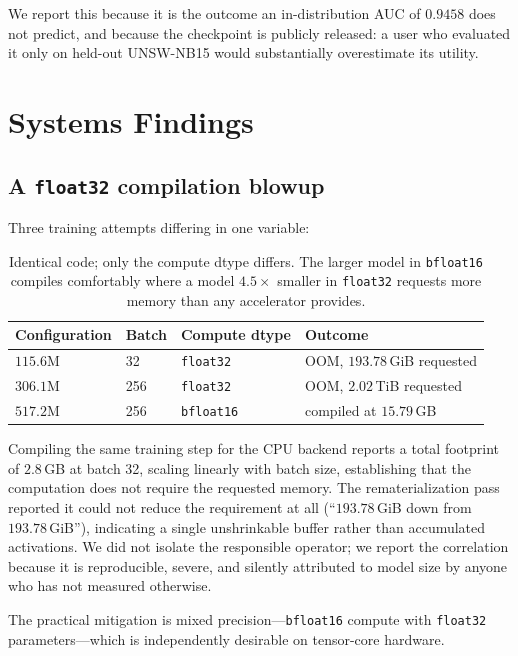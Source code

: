 \documentclass[11pt]{article}
\begin{document}
We report this because it is the outcome an in-distribution AUC of $0.9458$ does
not predict, and because the checkpoint is publicly released: a user who
evaluated it only on held-out UNSW-NB15 would substantially overestimate its
utility.

\section{Systems Findings}
\label{sec:systems}

\subsection{A \texttt{float32} compilation blowup}

Three training attempts differing in one variable:

\begin{table}[h]
\centering
\begin{tabular}{llll}
\toprule
Configuration & Batch & Compute dtype & Outcome \\
\midrule
$115.6$M & 32 & \texttt{float32} & OOM, $193.78$\,GiB requested \\
$306.1$M & 256 & \texttt{float32} & OOM, $2.02$\,TiB requested \\
$517.2$M & 256 & \texttt{bfloat16} & compiled at $15.79$\,GB \\
\bottomrule
\end{tabular}
\caption{Identical code; only the compute dtype differs. The larger model in
\texttt{bfloat16} compiles comfortably where a model $4.5\times$ smaller in
\texttt{float32} requests more memory than any accelerator provides.}
\label{tab:blowup}
\end{table}

Compiling the same training step for the CPU backend reports a total footprint
of $2.8$\,GB at batch 32, scaling linearly with batch size, establishing that the
computation does not require the requested memory. The rematerialization pass
reported it could not reduce the requirement at all
(``$193.78$\,GiB down from $193.78$\,GiB''), indicating a single unshrinkable
buffer rather than accumulated activations. We did not isolate the responsible
operator; we report the correlation because it is reproducible, severe, and
silently attributed to model size by anyone who has not measured otherwise.

The practical mitigation is mixed precision---\texttt{bfloat16} compute with
\texttt{float32} parameters---which is independently desirable on tensor-core
hardware.
\end{document}
